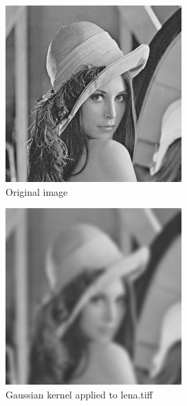 \documentclass{article}
\begin{document}
\begin{figure}[H]
  \begin{center}
    \includegraphics[width=\textwidth]{./images/lena.png}
    \caption{Original image}
    \label{lena}
  \end{center}
\end{figure}

\begin{figure}[H]
  \begin{center}
    \includegraphics[width=\textwidth]{./images/imG.png}
    \caption{Gaussian kernel applied to lena.tiff}
    \label{lenaGauss}
  \end{center}
\end{figure}
\end{document}
